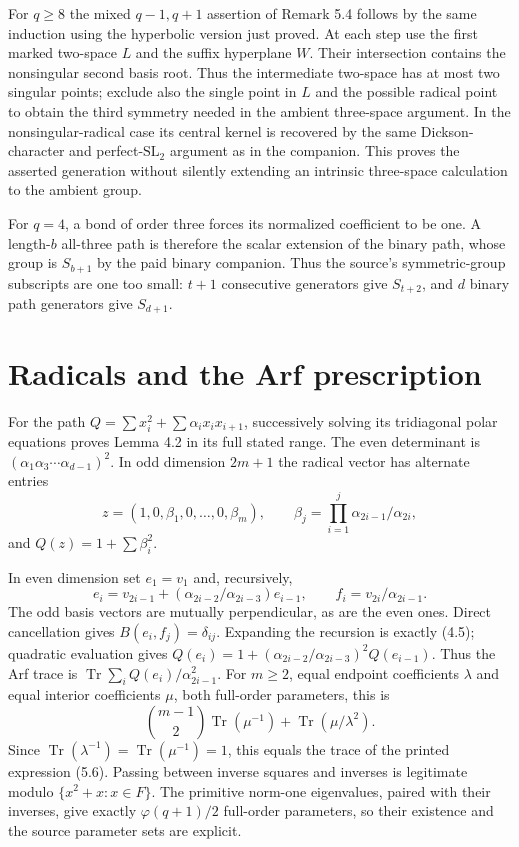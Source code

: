 \documentclass[11pt,a4paper]{article}
\newcommand{\Tr}{\operatorname{Tr}}
\begin{document}
For $q\geq8$ the mixed $q-1,q+1$ assertion of Remark 5.4 follows
by the same induction using the hyperbolic version just proved.
At each step use the first marked two-space $L$ and the suffix
hyperplane $W$. Their intersection contains the nonsingular
second basis root. Thus the intermediate two-space has at most
two singular points; exclude also the single point in $L$ and
the possible radical point to obtain the third symmetry needed
in the ambient three-space argument. In the nonsingular-radical
case its central kernel is recovered by the same Dickson-character
and perfect-$\mathrm{SL}_2$ argument as in the companion.
This proves the asserted generation without silently extending
an intrinsic three-space calculation to the ambient group.

For $q=4$, a bond of order three forces its normalized coefficient
to be one. A length-$b$ all-three path is therefore the scalar
extension of the binary path, whose group is $S_{b+1}$ by the
paid binary companion. Thus the source's symmetric-group
subscripts are one too small: $t+1$ consecutive generators give
$S_{t+2}$, and $d$ binary path generators give $S_{d+1}$.

\section{Radicals and the Arf prescription}
For the path $Q=\sum x_i^2+\sum\alpha_i x_ix_{i+1}$,
successively solving its tridiagonal polar equations proves
Lemma 4.2 in its full stated range. The even determinant is
$(\alpha_1\alpha_3\cdots\alpha_{d-1})^2$. In odd dimension
$2m+1$ the radical vector has alternate entries
\[
 z=(1,0,\beta_1,0,\ldots,0,\beta_m),\qquad
 \beta_j=\prod_{i=1}^j\alpha_{2i-1}/\alpha_{2i},
\]
and $Q(z)=1+\sum\beta_i^2$.

In even dimension set $e_1=v_1$ and, recursively,
\[
 e_i=v_{2i-1}+(\alpha_{2i-2}/\alpha_{2i-3})e_{i-1},
 \qquad f_i=v_{2i}/\alpha_{2i-1}.
\]
The odd basis vectors are mutually perpendicular, as are the
even ones. Direct cancellation gives $B(e_i,f_j)=\delta_{ij}$.
Expanding the recursion is exactly (4.5); quadratic evaluation
gives $Q(e_i)=1+(\alpha_{2i-2}/\alpha_{2i-3})^2Q(e_{i-1})$.
Thus the Arf trace is $\Tr\sum_i Q(e_i)/\alpha_{2i-1}^2$.
For $m\geq2$, equal endpoint coefficients $\lambda$ and equal
interior coefficients $\mu$, both full-order parameters, this is
\[
 \binom{m-1}{2}\Tr(\mu^{-1})+\Tr(\mu/\lambda^2).
\]
Since $\Tr(\lambda^{-1})=\Tr(\mu^{-1})=1$, this equals the
trace of the printed expression (5.6). Passing between inverse
squares and inverses is legitimate modulo $\{x^2+x:x\in F\}$.
The primitive norm-one eigenvalues, paired with their inverses,
give exactly $\varphi(q+1)/2$ full-order parameters, so their
existence and the source parameter sets are explicit.
\end{document}
